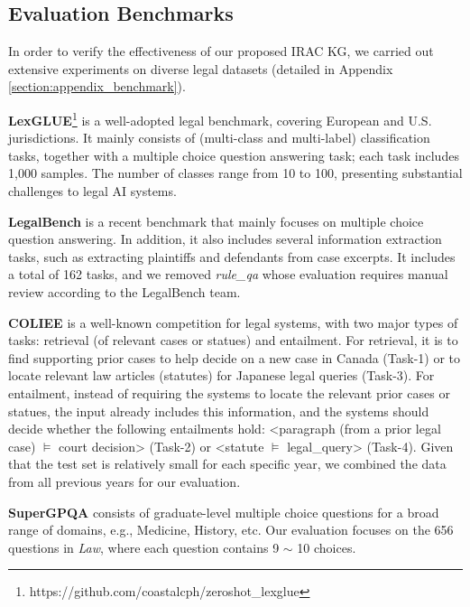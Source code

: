 \subsection{Evaluation Benchmarks}
\label{section:evaluation_benchmarks}

In order to verify the effectiveness of our proposed IRAC KG, we carried out extensive experiments on diverse legal datasets (detailed in Appendix \ref{section:appendix_benchmark}).

\textbf{LexGLUE}\footnote{https://github.com/coastalcph/zeroshot\_lexglue} \cite{DBLP:journals/corr/abs-2304-12202} is a well-adopted legal benchmark, covering European and U.S. jurisdictions. It mainly consists of (multi-class and multi-label) classification tasks, together with a multiple choice question answering task; each task includes 1,000 samples. The number of classes range from 10 to 100, presenting substantial challenges to legal AI systems.

\textbf{LegalBench} \cite{DBLP:conf/nips/GuhaNHRCKCPWRZT23} is a recent benchmark that mainly focuses on multiple choice question answering. In addition, it also includes several information extraction tasks, such as extracting plaintiffs and defendants from case excerpts. It includes a total of 162 tasks, and we removed \textit{rule\_qa} whose evaluation requires manual review according to the LegalBench team.

\textbf{COLIEE} \cite{DBLP:journals/rss/RabeloGKKYS22} is a well-known competition for legal systems, with two major types of tasks: retrieval (of relevant cases or statues) and entailment. For retrieval, it is to find supporting prior cases to help decide on a new case in Canada (Task-1) or to locate relevant law articles (statutes) for Japanese legal queries (Task-3). For entailment, instead of requiring the systems to locate the relevant prior cases or statues, the input already includes this information, and the systems should decide whether the following entailments hold: <paragraph (from a prior legal case) $\models$ court decision> (Task-2) or <statute $\models$ legal\_query> (Task-4). Given that the test set is relatively small for each specific year, we combined the data from all previous years for our evaluation.

\textbf{SuperGPQA} \cite{DBLP:journals/corr/abs-2502-14739} consists of graduate-level multiple choice questions for a broad range of domains, e.g., Medicine, History, etc. Our evaluation focuses on the 656 questions in \textit{Law}, where each question contains 9 $\sim$ 10 choices.


